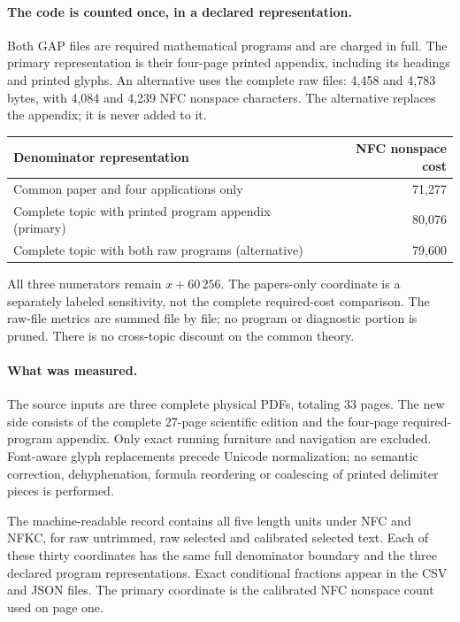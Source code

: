 \documentclass[11pt,a4paper]{article}
\begin{document}
\paragraph{The code is counted once, in a declared representation.}
Both GAP files are required mathematical programs and are charged in full.
The primary representation is their four-page printed appendix, including
its headings and printed glyphs. An alternative uses the complete raw files:
4,458 and 4,783 bytes, with 4,084 and 4,239 NFC nonspace characters.
The alternative replaces the appendix; it is never added to it.
\begin{center}\begin{tabular}{p{.64\linewidth}r}\toprule
Denominator representation & NFC nonspace cost\\\midrule
Common paper and four applications only & 71,277\\
Complete topic with printed program appendix (primary) & 80,076\\
Complete topic with both raw programs (alternative) & 79,600\\\bottomrule
\end{tabular}\end{center}
All three numerators remain $x+60\,256$. The papers-only coordinate is a
separately labeled sensitivity, not the complete required-cost comparison.
The raw-file metrics are summed file by file; no program or diagnostic
portion is pruned. There is no cross-topic discount on the common theory.

\paragraph{What was measured.}
The source inputs are three complete physical PDFs, totaling 33 pages.
The new side consists of the complete 27-page scientific edition and the
four-page required-program appendix. Only exact running furniture and
navigation are excluded. Font-aware glyph replacements precede Unicode
normalization; no semantic correction, dehyphenation, formula reordering or
coalescing of printed delimiter pieces is performed.

The machine-readable record contains all five length units under NFC and
NFKC, for raw untrimmed, raw selected and calibrated selected text. Each of
these thirty coordinates has the same full denominator boundary and the
three declared program representations. Exact conditional fractions appear
in the CSV and JSON files. The primary coordinate is the calibrated NFC
nonspace count used on page one.
\end{document}
